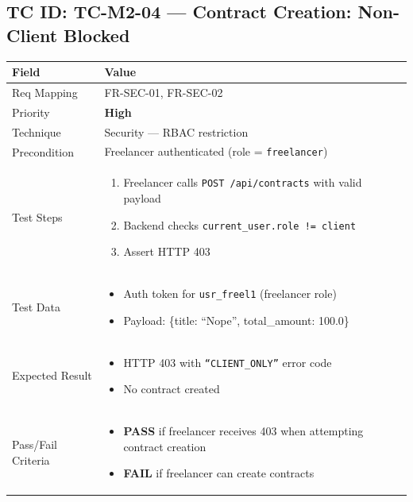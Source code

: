 \documentclass[12pt,a4paper]{article}
\newcommand{\sevhigh}{\textcolor{severityhigh}{\textbf{High}}}
\newcommand{\passresult}{\textcolor{passgreen}{\textbf{PASS}}}
\newcommand{\failresult}{\textcolor{failred}{\textbf{FAIL}}}
\begin{document}
\vspace{0.8cm}

\subsection{TC ID: TC-M2-04 --- Contract Creation: Non-Client Blocked}

\begin{tabular}{|p{}|p{}|}
\hline
\rowcolor{lightblue} \textbf{Field} & \textbf{Value} \\
\hline
Req Mapping & FR-SEC-01, FR-SEC-02 \\
\hline
Priority & \sevhigh \\
\hline
Technique & Security --- RBAC restriction \\
\hline
Precondition & Freelancer authenticated (role = \texttt{freelancer}) \\
\hline
Test Steps &
\begin{enumerate}[nosep, leftmargin=*]
  \item Freelancer calls \texttt{POST /api/contracts} with valid payload
  \item Backend checks \texttt{current\_user.role != client}
  \item Assert HTTP 403
\end{enumerate} \\
\hline
Test Data &
\begin{itemize}[nosep, leftmargin=*]
  \item Auth token for \texttt{usr\_freel1} (freelancer role)
  \item Payload: \{title: ``Nope'', total\_amount: 100.0\}
\end{itemize} \\
\hline
Expected Result &
\begin{itemize}[nosep, leftmargin=*]
  \item HTTP 403 with \texttt{``CLIENT\_ONLY''} error code
  \item No contract created
\end{itemize} \\
\hline
Pass/Fail Criteria &
\begin{itemize}[nosep, leftmargin=*]
  \item \passresult{} if freelancer receives 403 when attempting contract creation
  \item \failresult{} if freelancer can create contracts
\end{itemize} \\
\hline
\end{tabular}
\end{document}
